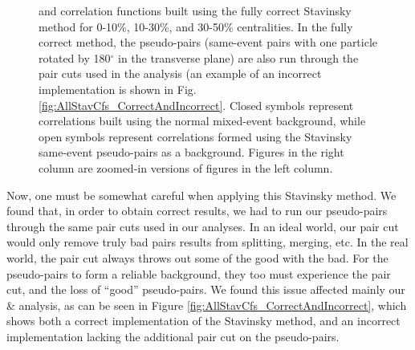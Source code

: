 \documentclass[../AnalysisNoteJBuxton.tex]{subfiles}
\begin{document}
\begin{figure}[h!]
  \caption[\LamK Stavinsky Correlation Functions (Correct)]{\LamK and \ALamAK correlation functions built using the fully correct Stavinsky method for 0-10\%, 10-30\%, and 30-50\% centralities.  In the fully correct method, the pseudo-pairs (same-event pairs with one particle rotated by 180$^\circ$ in the transverse plane) are also run through the pair cuts used in the analysis (an example of an incorrect implementation is shown in Fig. \ref{fig:AllStavCfs_CorrectAndIncorrect}.  Closed symbols represent correlations built using the normal mixed-event background, while open symbols represent correlations formed using the Stavinsky same-event pseudo-pairs as a background.  Figures in the right column are zoomed-in versions of figures in the left column.}
  \label{fig:AllStavCfs_Correct}
\end{figure}




Now, one must be somewhat careful when applying this Stavinsky method.  We found that, in order to obtain correct results, we had to run our pseudo-pairs through the same pair cuts used in our analyses.  In an ideal world, our pair cut would only remove truly bad pairs results from splitting, merging, etc.  In the real world, the pair cut always throws out some of the good with the bad.  For the pseudo-pairs to form a reliable background, they too must experience the pair cut, and the loss of ``good'' pseudo-pairs.  We found this issue affected mainly our \LamKchP \& \ALamKchM analysis, as can be seen in Figure \ref{fig:AllStavCfs_CorrectAndIncorrect}, which shows both a correct implementation of the Stavinsky method, and an incorrect implementation lacking the additional pair cut on the pseudo-pairs.
\end{document}
